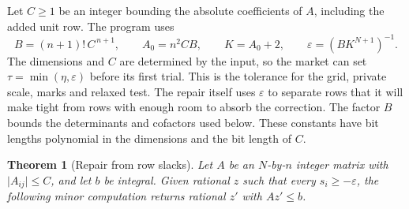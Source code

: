 \documentclass[11pt,letterpaper]{article}
\newcommand{\abs}[1]{\lvert#1\rvert}
\newtheorem{theorem}{Theorem}
\begin{document}
Let $C\ge1$ be an integer bounding the absolute coefficients of $A$,
including the added unit row. The program uses
\begin{equation}
 B=(n+1)!\,C^{\,n+1},\qquad
 A_0=n^2CB,\qquad K=A_0+2,\qquad
 \varepsilon=(B K^{N+1})^{-1}.                         \label{eq:precision}
\end{equation}
The dimensions and $C$ are determined by the input, so the market can
set $\tau=\min(\eta,\varepsilon)$ before its first trial. This is the
tolerance for the grid, private scale, marks and relaxed test. The
repair itself uses $\varepsilon$ to separate rows that it will make
tight from rows with enough room to absorb the correction. The factor
$B$ bounds the determinants and cofactors used below. These constants
have bit lengths polynomial in the dimensions and the bit length of $C$.

\begin{theorem}[Repair from row slacks]\label{thm:repair}
Let $A$ be an $N$-by-$n$ integer matrix with $\abs{A_{ij}}\le C$, and
let $b$ be integral. Given rational $z$ such that every $s_i\ge-\varepsilon$,
the following minor computation returns rational $z'$ with $Az'\le b$.
\end{theorem}
\end{document}
